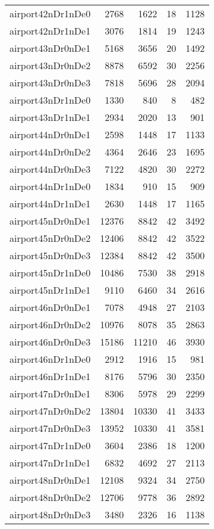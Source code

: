 \begin{tabular}{lrrrr}
airport42nDr1nDe0 & 2768 & 1622 & 18 & 1128 \\
airport42nDr1nDe1 & 3076 & 1814 & 19 & 1243 \\
airport43nDr0nDe1 & 5168 & 3656 & 20 & 1492 \\
airport43nDr0nDe2 & 8878 & 6592 & 30 & 2256 \\
airport43nDr0nDe3 & 7818 & 5696 & 28 & 2094 \\
airport43nDr1nDe0 & 1330 & 840 & 8 & 482 \\
airport43nDr1nDe1 & 2934 & 2020 & 13 & 901 \\
airport44nDr0nDe1 & 2598 & 1448 & 17 & 1133 \\
airport44nDr0nDe2 & 4364 & 2646 & 23 & 1695 \\
airport44nDr0nDe3 & 7122 & 4820 & 30 & 2272 \\
airport44nDr1nDe0 & 1834 & 910 & 15 & 909 \\
airport44nDr1nDe1 & 2630 & 1448 & 17 & 1165 \\
airport45nDr0nDe1 & 12376 & 8842 & 42 & 3492 \\
airport45nDr0nDe2 & 12406 & 8842 & 42 & 3522 \\
airport45nDr0nDe3 & 12384 & 8842 & 42 & 3500 \\
airport45nDr1nDe0 & 10486 & 7530 & 38 & 2918 \\
airport45nDr1nDe1 & 9110 & 6460 & 34 & 2616 \\
airport46nDr0nDe1 & 7078 & 4948 & 27 & 2103 \\
airport46nDr0nDe2 & 10976 & 8078 & 35 & 2863 \\
airport46nDr0nDe3 & 15186 & 11210 & 46 & 3930 \\
airport46nDr1nDe0 & 2912 & 1916 & 15 & 981 \\
airport46nDr1nDe1 & 8176 & 5796 & 30 & 2350 \\
airport47nDr0nDe1 & 8306 & 5978 & 29 & 2299 \\
airport47nDr0nDe2 & 13804 & 10330 & 41 & 3433 \\
airport47nDr0nDe3 & 13952 & 10330 & 41 & 3581 \\
airport47nDr1nDe0 & 3604 & 2386 & 18 & 1200 \\
airport47nDr1nDe1 & 6832 & 4692 & 27 & 2113 \\
airport48nDr0nDe1 & 12108 & 9324 & 34 & 2750 \\
airport48nDr0nDe2 & 12706 & 9778 & 36 & 2892 \\
airport48nDr0nDe3 & 3480 & 2326 & 16 & 1138 \\

\end{tabular}
